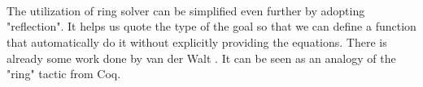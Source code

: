 \begin{code}
\\
\> \AgdaSymbol{:} \<[9]%
\>[9]\AgdaFunction{\_*\_}  \AgdaFunction{\_+\_}\<%
\\
\> \AgdaSymbol{(} \AgdaInductiveConstructor{,} \AgdaSymbol{)} \AgdaSymbol{(} \AgdaInductiveConstructor{,} \AgdaSymbol{)} \AgdaSymbol{(} \AgdaInductiveConstructor{,} \AgdaSymbol{)} \AgdaSymbol{=}   \<[40]%
\>[40]\<%
\\
\>[0]\<[2]%
\>[2]         \AgdaFunction{:*} \AgdaSymbol{(} \AgdaFunction{:+} \AgdaSymbol{)} \AgdaFunction{:+}  \AgdaFunction{:*} \AgdaSymbol{(} \AgdaFunction{:+} \AgdaSymbol{)} \AgdaFunction{:+}\<%
\\
\>[2]\<[6]%
\>[6]\AgdaSymbol{(} \AgdaFunction{:*}  \AgdaFunction{:+}  \AgdaFunction{:*}  \AgdaFunction{:+} \AgdaSymbol{(} \AgdaFunction{:*}  \AgdaFunction{:+}  \AgdaFunction{:*} \AgdaSymbol{))}\<%
\\
\>[2]\<[6]%
\>[6]\AgdaFunction{:=}\<%
\\
\>[2]\<[6]%
\>[6] \AgdaFunction{:*}  \AgdaFunction{:+}  \AgdaFunction{:*}  \AgdaFunction{:+} \AgdaSymbol{(} \AgdaFunction{:*}  \AgdaFunction{:+}  \AgdaFunction{:*} \AgdaSymbol{)} \AgdaFunction{:+}\<%
\\
\>[2]\<[6]%
\>[6]\AgdaSymbol{(} \AgdaFunction{:*} \AgdaSymbol{(} \AgdaFunction{:+} \AgdaSymbol{)} \AgdaFunction{:+}  \AgdaFunction{:*} \AgdaSymbol{(} \AgdaFunction{:+} \AgdaSymbol{)))}       \<%
\\
\end{code}

The utilization of ring solver can be simplified even further by
adopting "reflection". It helps us quote the type of the goal so
that we can define a function that automatically do it without
explicitly providing the equations. There is already some work
done by van der Walt \cite{van2012reflection}. It can be seen as an
analogy of the "ring" tactic from Coq.



